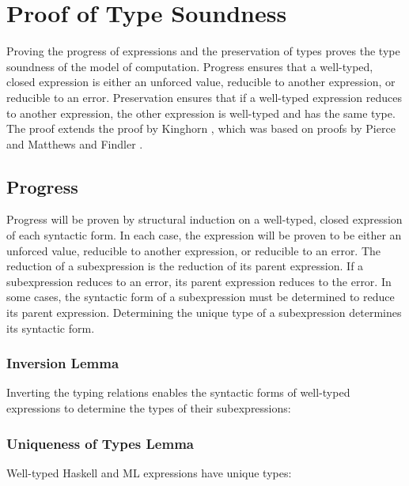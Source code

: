 \chapter{Proof of Type Soundness}

Proving the progress of expressions and the preservation of types proves the type soundness of the model of computation.  Progress ensures that a well-typed, closed expression is either an unforced value, reducible to another expression, or reducible to an error.  Preservation ensures that if a well-typed expression reduces to another expression, the other expression is well-typed and has the same type.  The proof extends the proof by Kinghorn \cite{kinghorn07}, which was based on proofs by Pierce \cite{pierce02} and Matthews and Findler \cite{matthews07}.

\section{Progress}

Progress will be proven by structural induction on a well-typed, closed expression of each syntactic form.  In each case, the expression will be proven to be either an unforced value, reducible to another expression, or reducible to an error.  The reduction of a subexpression is the reduction of its parent expression.  If a subexpression reduces to an error, its parent expression reduces to the error.  In some cases, the syntactic form of a subexpression must be determined to reduce its parent expression.  Determining the unique type of a subexpression determines its syntactic form.

\subsection{Inversion Lemma}

Inverting the typing relations enables the syntactic forms of well-typed expressions to determine the types of their subexpressions:



\subsection{Uniqueness of Types Lemma}

Well-typed Haskell and ML expressions have unique types:



